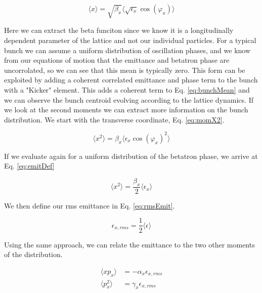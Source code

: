 \begin{equation} \label{eq:bunchMean}
	\langle x \rangle  = \sqrt{\beta_x} \langle \sqrt{\epsilon_x} \cos{(\varphi_x)}\rangle 
\end{equation}

Here we can extract the beta funciton since we know it is a longitudinally dependent parameter of the lattice and not our individual particles. For a typical bunch we can assume a uniform distribution of oscillation phases, and we know from our equations of motion that the emittance and betatron phase are uncorrolated, so we can see that this mean is typically zero. This form can be exploited by adding a coherent correlated emittance and phase term to the bunch with a "Kicker" element. This adds a coherent term to Eq. \ref{eq:bunchMean} and we can observe the bunch centroid evolving according to the lattice dynamics. If we look at the second moments we can extract more information on the bunch distribution. We start with the transverse coordinate, Eq. \ref{eq:momX2}.

\begin{equation} \label{eq:momX2}
	\langle x^2 \rangle = \beta_x \langle \epsilon_x \cos{(\varphi_x)}^2 \rangle
\end{equation}

If we evaluate again for a uniform distribution of the betatron phase, we arrive at Eq. \ref{eq:emitDef}

\begin{equation} \label{eq:emitDef}
	\langle x^2 \rangle = \frac{\beta_x}{2} \langle \epsilon_x \rangle
\end{equation}

We then define our rms emittance in Eq. \ref{eq:rmsEmit}. 

\begin{equation} \label{eq:rmsEmit}
	\epsilon_{x,rms} = \frac{1}{2} \langle \epsilon \rangle
\end{equation}

Using the same approach, we can relate the emittance to the two other moments of the distribution.

\begin{equation} \label{eq:momP2}
\begin{split}
	\langle x p_x \rangle &= -\alpha_x \epsilon_{x,rms}\\
	\langle p_x^2 \rangle &= \gamma_x \epsilon_{x,rms}
\end{split}
\end{equation}

